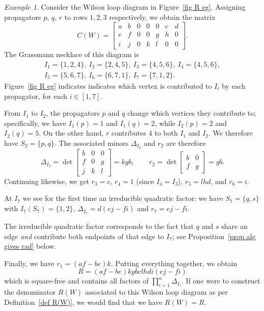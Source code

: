 \documentclass[11pt]{article}
\theoremstyle{remark}
\newtheorem{eg}[thm]{Example}
\theoremstyle{definition}
\begin{document}
\begin{eg}
Consider the Wilson loop diagram in Figure~\ref{fig R eg}. Assigning propagators $p$, $q$, $r$ to rows $1,2,3$ respectively, we obtain the matrix
\[
C(W) = \begin{bmatrix} a & b & 0 & 0 & 0 & c & d \\ e & f & 0 & 0 & g & h & 0 \\ i & j & 0 & k & l & 0 & 0 \end{bmatrix}.
\]
The Grassmann necklace of this diagram is 
\begin{gather*}I_1 = \{1,2,4\},\ I_2 = \{2,4,5\},\ I_3 = \{4,5,6\},\ I_4=\{4,5,6\},\\ I_5=\{5,6,7\},\ I_6 = \{6,7,1\},\ I_7=\{7,1,2\}. \end{gather*}  
Figure~\ref{fig R eg} indicates indicates which vertex is contributed to $I_i$ by each propagator, for each $i \in [1,7]$.  

From $I_1$ to $I_2$, the propagators $p$ and $q$ change which vertices they contribute to; specifically, we have $I_1(p) = 1$ and $I_1(q)= 2$, while $I_2(p) = 2$ and $I_2(q)= 5$. On the other hand, $r$ contributes  4 to both $I_1$ and $I_2$. We therefore have $S_2 = \{p,q\}$.  The associated minors $\Delta_{I_2}$ and $r_2$ are therefore
\[
\Delta_{I_2}=\det\begin{bmatrix} b & 0 & 0 \\ f & 0 & g \\ j & k & l \end{bmatrix} = kgb, \qquad r_2 = \det\begin{bmatrix} b & 0 \\ f & g \end{bmatrix} = gb.
\] 
Continuing likewise, we get $r_3 = c$, $r_4=1$ (since $I_4 = I_3$), $r_5 = lhd$, and $r_6 = i$.

At $I_7$ we see for the first time an irreducible quadratic factor: we have $S_7 = \{q,s\}$ with ${I_7(S_7) = \{ 1,2\}}$, $\Delta_{I_7} = d(ej-fi)$ and $r_7 = ej-fi$. 

The irreducible quadratic factor corresponds to the fact that $q$ and $s$ share an edge {\em and} contribute both endpoints of that edge to $I_7$; see Proposition~\ref{prop alg gives rad} below.  

Finally, we have $r_1 = (af-be)k$.  Putting everything together, we obtain
\[
R = (af-be)kgbclhdi(ej-fi)
\]
which is square-free and contains all factors of $\prod_{i=1}^{n}\Delta_{I_i}$. If one were to construct the denominator $R(W)$ associated to this Wilson loop diagram as per Definition~\ref{def R(W)}, we would find that we have $R(W) = R$.
\end{eg}
\end{document}
